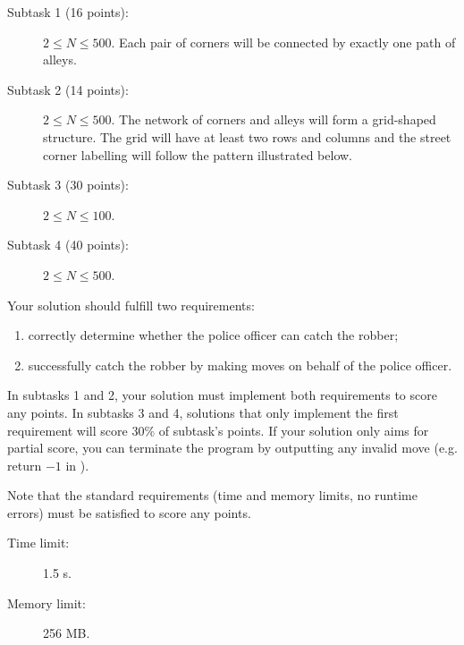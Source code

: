 \documentclass{boi2014}
\begin{document}
    \Scoring
    
    \begin{description}
        \item[Subtask 1 (16 points):] $2 \le N \le 500$.
        Each pair of corners will be connected by exactly one path of alleys.
        \item[Subtask 2 (14 points):] $2 \le N \le 500$. The network of corners
        and alleys will form a grid-shaped structure. The grid will have at
        least two rows and columns and the street corner labelling will follow
        the pattern illustrated below.
        \begin{figure}[h!]
           \centering
        \end{figure}
        \item[Subtask 3 (30 points):] $2 \le N \le 100$.
        \item[Subtask 4 (40 points):] $2 \le N \le 500$.
    \end{description}
    
    Your solution should fulfill two requirements:
    \begin{enumerate}
    	\item correctly determine whether the police officer can catch
    		the robber;
	\item successfully catch the robber by making moves on behalf
		of the police officer.
    \end{enumerate}
    
    In subtasks 1 and 2, your solution must implement both requirements to score any points.
    In subtasks 3 and 4, solutions that only implement the
    first requirement will score 30\% of subtask's points.
    If your solution only aims for partial score, you can terminate
    the program by outputting any invalid move (e.g. return $-1$ in ).

	Note that the standard requirements (time and memory limits, no runtime errors)
	must be satisfied to score any points.
    
    \Constraints
    
    \begin{description}
        \item[Time limit:] 1.5 s.
        \item[Memory limit:] 256 MB.
    \end{description}
\end{document}

